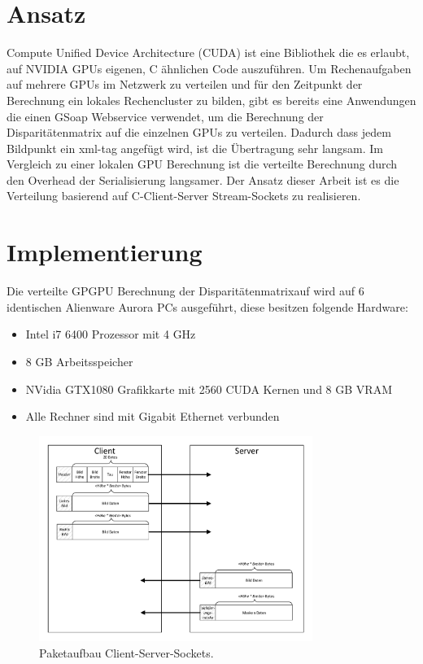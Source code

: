 \documentclass[conference]{IEEEtran}
\begin{document}
 

\section{Ansatz}
Compute Unified Device Architecture (CUDA) ist eine Bibliothek die es erlaubt, auf NVIDIA GPUs eigenen, C ähnlichen Code auszuführen. Um Rechenaufgaben auf mehrere GPUs im Netzwerk zu verteilen und für den Zeitpunkt der Berechnung ein lokales Rechencluster zu bilden, gibt es bereits eine Anwendungen die einen GSoap Webservice verwendet, um die Berechnung der Disparitätenmatrix auf die einzelnen GPUs zu verteilen. Dadurch dass jedem Bildpunkt ein xml-tag angefügt wird, ist die Übertragung sehr langsam. Im Vergleich zu einer lokalen GPU Berechnung ist die verteilte Berechnung durch den Overhead der Serialisierung langsamer. Der Ansatz dieser Arbeit ist es die Verteilung basierend auf C-Client-Server Stream-Sockets zu realisieren.

\section{Implementierung}
Die verteilte GPGPU Berechnung der Disparitätenmatrixauf wird auf 6 identischen Alienware Aurora PCs ausgeführt, diese besitzen folgende Hardware:
\begin{itemize}
\item Intel i7 6400 Prozessor mit 4 GHz
\item 8 GB Arbeitsspeicher
\item NVidia GTX1080 Grafikkarte mit 2560 CUDA Kernen und 8 GB VRAM
\item Alle Rechner sind mit Gigabit Ethernet verbunden
\end{itemize}


\begin{figure}[!t]
	\centering
	\includegraphics[width=3.5in]{Datenformat.pdf} %
	\caption{Paketaufbau Client-Server-Sockets.}
	\label{fig_client_server}
\end{figure}
\end{document}
